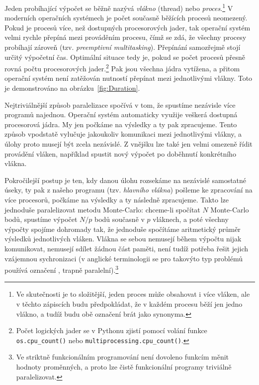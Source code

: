 \documentclass[a4paper,11pt,twoside]{article}
\def\code#1{\textnormal{\texttt{#1}}}
\theoremstyle{red}
\theoremstyle{green}
\begin{document}
    Jeden probíhající výpočet se běžně nazývá \emph{vlákno} (thread) nebo \emph{proces}.\footnote{
        Ve skutečnosti je to složitější, jeden proces může obsahovat i více vláken, ale v těchto zápiscích budu předpokládat, že v každém procesu běží jen jedno vlákno, a tudíž budu obě označení brát jako synonyma.
    }
    V moderních operačních systémech je počet současně běžících procesů neomezený.
    Pokud je procesů více, než dostupných procesorových jader, tak operační systém velmi rychle přepíná mezi prováděním procesu, čímž se zdá, že všechny procesy probíhají zároveň (tzv. \emph{preemptivní multitasking}).
    Přepínání samozřejmě stojí určitý výpočetní čas.
    Optimální situace tedy je, pokud se počet procesů přesně rovná počtu procesorových jader.\footnote{
        Počet logických jader se v Pythonu zjistí pomocí volání funkce \code{os.cpu_count()} nebo \code{multiprocessing.cpu_count()}.
    }
    Pak jsou všechna jádra vytížena, a přitom operační systém není zatěžován nutností přepínat mezi jednotlivými vlákny. 
    Toto je demonstrováno na obrázku~\ref{fig:Duration}.
    
    Nejtriviálnější způsob paralelizace spočívá v tom, že spustíme nezávisle více programů najednou.
    Operační systém automaticky využije veškerá dostupná procesorová jádra.
    My jen počkáme na výsledky a ty pak zpracujeme.
    Tento způsob vpodstatě vylučuje jakoukoliv komunikaci mezi jednotlivými vlákny, a úlohy proto musejí být zcela nezávislé.
    Z vnějšku lze také jen velmi omezeně řídit provádění vláken, například spustit nový výpočet po doběhnutí konkrétního vlákna. 

    Pokročilejší postup je ten, kdy danou úlohu rozsekáme na nezávislé samostatné úseky, ty pak z našeho programu (tzv. \emph{hlavního vlákna}) pošleme ke zpracování na více procesorů, počkáme na výsledky a ty následně zpracujeme.
    Takto lze jednoduše paralelizovat metodu Monte-Carlo: chceme-li spočítat $N$ Monte-Carlo bodů, spustíme výpočet $N/p$ bodů současně v $p$ vláknech, a poté všechny výpočty spojíme dohromady tak, že jednoduše spočítáme aritmetický průměr výsledků jednotlivých vláken.
    Vlákna se sebou nemusejí během výpočtu nijak komunikovat, nemusejí sdílet žádnou část paměti, není tudíž potřeba řešit jejich vzájemnou sychronizaci (v anglické terminologii se pro takovýto typ problémů používá označení , trapně paralelní).\footnote{
        Ve striktně funkcionálním programování není dovoleno funkcím měnit hodnoty proměnných, a proto lze čistě funkcionální programy triviálně paralelizovat.
    }
    
\end{document}
